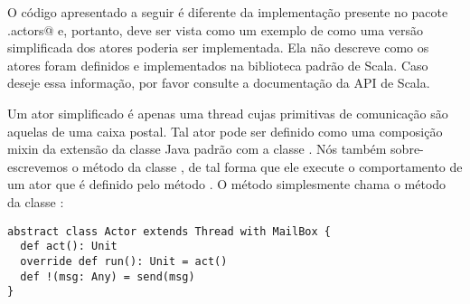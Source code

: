 O código apresentado a seguir é diferente da implementação presente no pacote \lstinline@scala.actors@ e, 
portanto, deve ser vista como um exemplo de como uma versão simplificada dos atores poderia ser implementada.
Ela não descreve como os atores foram definidos e implementados na biblioteca padrão de Scala. Caso deseje
essa informação, por favor consulte a documentação da API de Scala.

Um ator simplificado é apenas uma thread cujas primitivas de comunicação são aquelas de uma caixa postal.
Tal ator pode ser definido como uma composição mixin da extensão da classe Java padrão 
 com a classe . Nós também sobre-escrevemos o método  da classe , de 
tal forma que ele execute o comportamento de um ator que é definido pelo método .
O método \code{!} simplesmente chama o método  da classe 
:
\begin{lstlisting}
abstract class Actor extends Thread with MailBox {
  def act(): Unit
  override def run(): Unit = act()
  def !(msg: Any) = send(msg)
}
\end{lstlisting}



